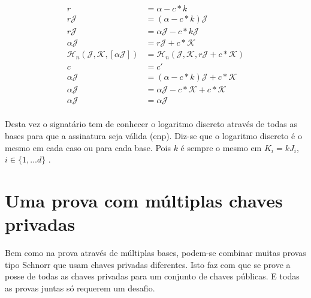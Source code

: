 \begin{align*}
                 r &= \alpha - c*k  \\
  	 r \mathcal{J} &= (\alpha - c*k) \mathcal{J}  \\
     r \mathcal{J} &= \alpha \mathcal{J} - c*k \mathcal{J}  \\
\alpha \mathcal{J} &= r \mathcal{J} + c* \mathcal{K}\\
\mathcal{H}_n(\mathcal{J}, \mathcal{K}, [\alpha \mathcal{J}]) &= \mathcal{H}_n(\mathcal{J}, \mathcal{K}, r \mathcal{J} + c* \mathcal{K}) \\
       c &= c' \\
\alpha \mathcal{J} &= (\alpha - c*k) \mathcal{J} + c* \mathcal{K}\\
\alpha \mathcal{J} &= \alpha \mathcal{J} - c*\mathcal{K} + c*\mathcal{K}\\
\alpha \mathcal{J} &= \alpha \mathcal{J}\\
\end{align*}

Desta vez o signatário tem de conhecer o logaritmo discreto através de todas as bases para que a assinatura seja válida (enp). Diz-se que o logaritmo discreto é o mesmo em cada caso ou para cada base. Pois $k$ é sempre o mesmo em $K_i = k J_i$, $i \in \{1,...d\}$ .  
\section{Uma prova com múltiplas chaves privadas}
\label{sec:multiple_private_keys_in_one_proof}

Bem como na prova através de múltiplas bases, podem-se combinar muitas provas tipo Schnorr que usam chaves privadas diferentes. Isto faz com que se prove a posse de todas as chaves privadas para um conjunto de chaves públicas. E todas as provas juntas só requerem um desafio.    


